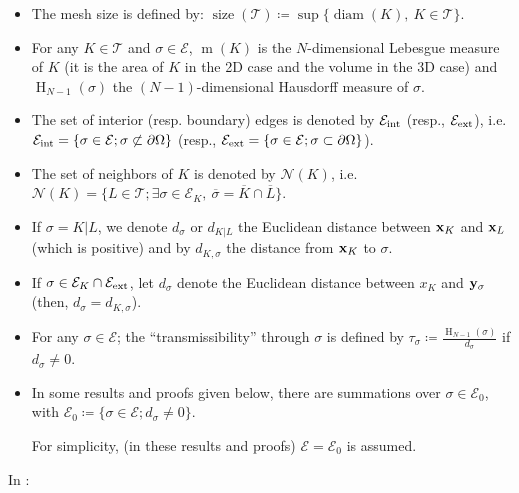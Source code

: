 \documentclass[oneside,11pt]{book}
\numberwithin{equation}{section}
\begin{document}
\begin{itemize}
    \item The mesh size is defined by: $\operatorname{size}(\mathcal{T})\coloneqq\sup\{\operatorname{diam}(K),\ K\in\mathcal{T}\}$.
    \item For any $K\in\mathcal{T}$ and $\sigma\in\mathcal{E}$, $\operatorname{m}(K)$ is the $N$-dimensional Lebesgue measure of $K$ (it is the area of $K$ in the 2D case and the volume in the 3D case) and $\operatorname{H}_{N-1}(\sigma)$ the $(N - 1)$-dimensional Hausdorff measure of $\sigma$.
    \item The set of interior (resp. boundary) edges is denoted by $\mathcal{E}_{\rm int}$ (resp., $\mathcal{E}_{\rm ext}$), i.e. $\mathcal{E}_{\rm int} = \{\sigma\in\mathcal{E};\sigma\not\subset\partial\Omega\}$ (resp., $\mathcal{E}_{\rm ext} = \{\sigma\in\mathcal{E};\sigma\subset\partial\Omega\}$).
    \item The set of neighbors of $K$ is denoted by $\mathcal{N}(K)$, i.e. $\mathcal{N}(K) = \{L\in\mathcal{T};\exists\sigma\in\mathcal{E}_K,\ \overline{\sigma} = \overline{K}\cap\overline{L}\}$.
    \item If $\sigma = K|L$, we denote $d_\sigma$ or $d_{K|L}$ the Euclidean distance between ${\bf x}_K$ and ${\bf x}_L$ (which is positive) and by $d_{K,\sigma}$ the distance from ${\bf x}_K$ to $\sigma$.
    \item If $\sigma\in\mathcal{E}_K\cap\mathcal{E}_{\rm ext}$, let $d_\sigma$ denote the Euclidean distance between $x_K$ and ${\bf y}_\sigma$ (then, $d_\sigma = d_{K,\sigma}$).
    \item For any $\sigma\in\mathcal{E}$; the ``transmissibility'' through $\sigma$ is defined by $\tau_\sigma\coloneqq\frac{\operatorname{H}_{N-1}(\sigma)}{d_\sigma}$ if $d_\sigma\ne 0$.
    \item In some results and proofs given below, there are summations over $\sigma\in\mathcal{E}_0$, with $\mathcal{E}_0\coloneqq\{\sigma\in\mathcal{E};d_\sigma\ne 0\}$.
    
    For simplicity, (in these results and proofs) $\mathcal{E} = \mathcal{E}_0$ is assumed.
\end{itemize}
In \cite[p. 673]{Mazya_Rossmann2009}:
\end{document}
